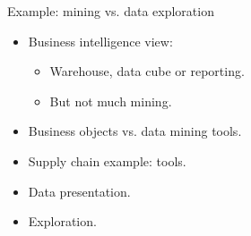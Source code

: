 \documentclass[aspectratio=169,t]{beamer}
\begin{document}
  { 
    \begin{frame}{Example: mining vs. data exploration}
    \begin{itemize}
        \item Business intelligence view:
        \begin{itemize}
            \item Warehouse, data cube or reporting.
            \item But not much mining.
        \end{itemize}
        \item Business objects vs. data mining tools.
        \item Supply chain example: tools.
        \item Data presentation.
        \item Exploration.
    \end{itemize}
    \end{frame}
  }
\end{document}
